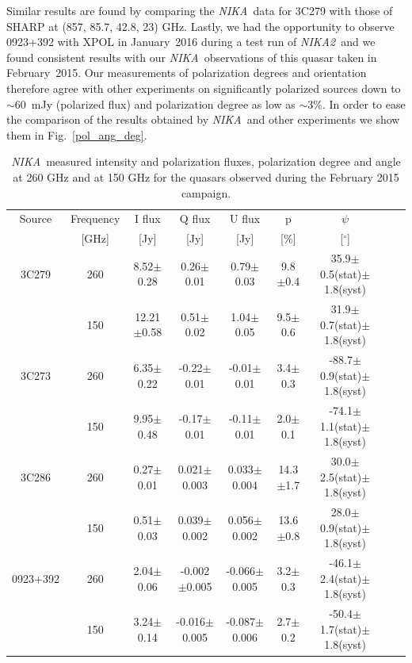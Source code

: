 \documentclass[twocolumn, traditabstract]{aa}
\newcommand{\nika}{{\it NIKA}}
\newcommand{\nikad}{{\it NIKA2}}
\begin{document}
  Similar results are found by comparing the \nika\ data for 3C279 with
 those of SHARP \citep{sharp3c279} at  (857, 85.7, 42.8, 23) GHz. Lastly, we
 had the opportunity to observe 0923+392 with XPOL in January~2016 during a test
 run of \nikad\ and we found consistent results with our \nika\ observations of
 this quasar taken in February~2015. Our measurements of polarization degrees and
 orientation therefore agree with other experiments on significantly polarized
 sources down to $\sim 60$~mJy (polarized flux) and polarization degree as low
 as $\sim 3\%$. 
 In order to ease the comparison of the results obtained by \nika\ and other experiments we show them in Fig.~\ref{pol_ang_deg}.
    \begin{table}
  \begin{center}
    \caption{\nika\ measured intensity and polarization fluxes, polarization
      degree and angle at 260 GHz and at 150 GHz for the quasars observed during
      the February 2015 campaign.}
    \begin{tabular}{ccccccccc}
      \hline
      \hline
      Source & Frequency & I flux & Q flux &  U flux  & p & $\psi$  \\ 
      & [GHz]         & [Jy] & [Jy] & [Jy] & [\%] & [$^\circ$] \\ 
      \hline
      \hline
      3C279 & 260 &  8.52$\pm$0.28 &  0.26$\pm$0.01 & 0.79$\pm$0.03 & 9.8 $\pm$0.4 & 35.9$\pm$0.5(stat)$\pm$1.8(syst)  \\
      & 150 &  12.21$\pm$0.58 &  0.51$\pm$0.02 &  1.04$\pm$0.05 &  9.5$\pm$0.6 & 31.9$\pm$0.7(stat)$\pm$1.8(syst) \\
      \hline
      3C273 & 260 &  6.35$\pm$0.22 & -0.22$\pm$0.01 & -0.01$\pm$0.01 &  3.4$\pm$0.3 & -88.7$\pm$0.9(stat)$\pm$1.8(syst) \\
      & 150 & 9.95$\pm$0.48 & -0.17$\pm$0.01 & -0.11$\pm$0.01 &  2.0$\pm$0.1 & -74.1$\pm$1.1(stat)$\pm$ 1.8(syst) \\
      \hline
      3C286 & 260 &  0.27$\pm$0.01 & 0.021$\pm$0.003 & 0.033$\pm$0.004 &  14.3$\pm$1.7 & 30.0$\pm$2.5(stat)$\pm$1.8(syst) \\
      & 150 & 0.51$\pm$0.03 & 0.039$\pm$0.002 & 0.056$\pm$0.002 & 13.6$\pm$0.8 &  28.0$\pm$0.9(stat)$\pm$1.8(syst) \\
      \hline
      0923+392 & 260 & 2.04$\pm$0.06 & -0.002 $\pm$0.005 & -0.066$\pm$0.005 & 3.2$\pm$0.3 & -46.1$\pm$2.4(stat)$\pm$1.8(syst) \\
      & 150 & 3.24$\pm$0.14 & -0.016$\pm$0.005 &  -0.087$\pm$0.006 & 2.7$\pm$0.2 & -50.4$\pm$1.7(stat)$\pm$1.8(syst)  \\
      \hline
      \hline
    \end{tabular}
    \label{tab:table_quasar}
  \end{center}
\end{table}
\end{document}
